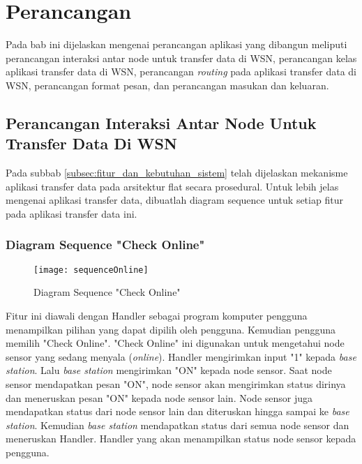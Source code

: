 \chapter{Perancangan}
\label{chap:perancangan}
Pada bab ini dijelaskan mengenai perancangan aplikasi yang dibangun meliputi perancangan interaksi antar node untuk transfer data di WSN, perancangan kelas aplikasi transfer data di WSN, perancangan \textit{routing} pada aplikasi transfer data di WSN, perancangan format pesan, dan perancangan masukan dan keluaran.

\section{Perancangan Interaksi Antar Node Untuk Transfer Data Di WSN}
Pada subbab \ref{subsec:fitur_dan_kebutuhan_sistem} telah dijelaskan mekanisme aplikasi transfer data pada arsitektur flat secara prosedural. Untuk lebih jelas mengenai aplikasi transfer data, dibuatlah diagram sequence untuk setiap fitur pada aplikasi transfer data ini. 

\subsection{Diagram Sequence "Check Online"}
\begin{figure}[H]
	\centering
	\texttt{[image: sequenceOnline]}
	\caption{Diagram Sequence "Check Online"}
	\label{fig:sequenceOnline}
\end{figure}
Fitur ini diawali dengan Handler sebagai program komputer pengguna menampilkan pilihan yang dapat dipilih oleh pengguna. Kemudian pengguna memilih "Check Online". "Check Online" ini digunakan untuk mengetahui node sensor yang sedang menyala (\textit{online}). Handler mengirimkan input "1" kepada \textit{base station}. Lalu \textit{base station} mengirimkan "ON" kepada node sensor. Saat node sensor mendapatkan pesan "ON", node sensor akan mengirimkan status dirinya dan meneruskan pesan "ON" kepada node sensor lain. Node sensor juga mendapatkan status dari node sensor lain dan diteruskan hingga sampai ke \textit{base station}. Kemudian \textit{base station} mendapatkan status dari semua node sensor dan meneruskan Handler. Handler yang akan menampilkan status node sensor kepada pengguna.
